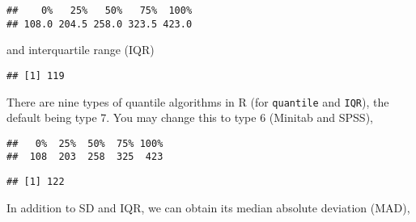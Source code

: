 \documentclass[]{book}
\newenvironment{Shaded}{\begin{snugshade}}{\end{snugshade}}
\newcommand{\KeywordTok}[1]{\textcolor[rgb]{0.13,0.29,0.53}{\textbf{#1}}}
\newcommand{\DataTypeTok}[1]{\textcolor[rgb]{0.13,0.29,0.53}{#1}}
\newcommand{\DecValTok}[1]{\textcolor[rgb]{0.00,0.00,0.81}{#1}}
\newcommand{\OperatorTok}[1]{\textcolor[rgb]{0.81,0.36,0.00}{\textbf{#1}}}
\newcommand{\NormalTok}[1]{#1}
\theoremstyle{definition}
\theoremstyle{definition}
\theoremstyle{remark}
\begin{document}
\begin{verbatim}
##    0%   25%   50%   75%  100% 
## 108.0 204.5 258.0 323.5 423.0
\end{verbatim}

and interquartile range (IQR)

\begin{Shaded}
\end{Shaded}

\begin{verbatim}
## [1] 119
\end{verbatim}

There are nine types of quantile algorithms in R (for \texttt{quantile}
and \texttt{IQR}), the default being type 7. You may change this to type
6 (Minitab and SPSS),

\begin{Shaded}
\end{Shaded}

\begin{verbatim}
##   0%  25%  50%  75% 100% 
##  108  203  258  325  423
\end{verbatim}

\begin{Shaded}
\end{Shaded}

\begin{verbatim}
## [1] 122
\end{verbatim}

In addition to SD and IQR, we can obtain its median absolute deviation
(MAD),

\begin{Shaded}
\end{Shaded}
\end{document}
